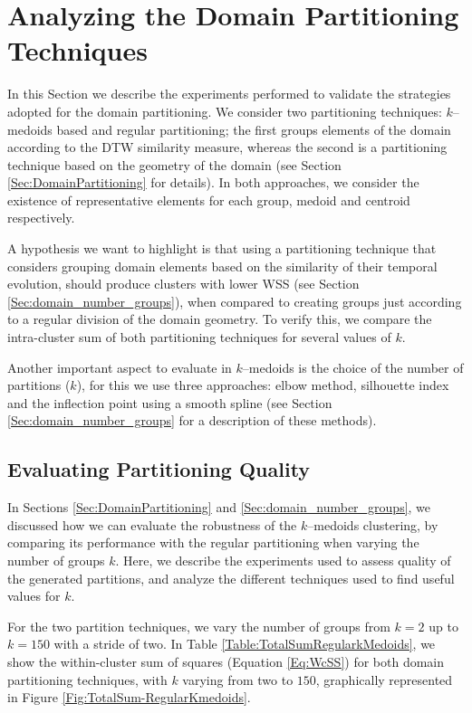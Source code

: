 \section{Analyzing the Domain Partitioning Techniques}
\label{Sec:AnalyzeDomainPartitioning}

In this Section we describe the experiments performed to validate the strategies adopted for the domain partitioning. We consider two partitioning techniques: $k$--medoids based and regular partitioning; the first groups elements of the domain according to the DTW similarity measure, whereas the second is a partitioning technique based on the geometry of the domain (see Section \ref{Sec:DomainPartitioning} for details). In both approaches, we consider the existence of representative elements for each group, medoid and centroid respectively.

A hypothesis we want to highlight is that using a partitioning technique that considers grouping domain elements based on the similarity of their temporal evolution, should produce clusters with lower WSS (see Section \ref{Sec:domain_number_groups}), when compared to creating groups just according to a regular division of the domain geometry. To verify this, we compare the intra-cluster sum of both partitioning techniques for several values of $k$.

Another important aspect to evaluate in $k$--medoids is the choice of the number of partitions ($k$), for this we use three approaches: elbow method, silhouette index and the inflection point using a smooth spline (see Section \ref{Sec:domain_number_groups} for a description of these methods).

\subsection{Evaluating Partitioning Quality}
\label{Sec:EvaluatingPP}

In Sections \ref{Sec:DomainPartitioning} and \ref{Sec:domain_number_groups}, we discussed how we can evaluate the robustness of the $k$--medoids clustering, by comparing its performance with the regular partitioning when varying the number of groups $k$. Here, we describe the experiments used to assess quality of the generated partitions, and analyze the different techniques used to find useful values for $k$.  

For the two partition techniques, we vary the number of groups from $k=2$ up to $k=150$ with a stride of two. In Table \ref{Table:TotalSumRegularkMedoids}, we show the within-cluster sum of squares (Equation \ref{Eq:WcSS}) for both domain partitioning techniques, with $k$ varying from two to $150$, graphically represented in Figure \ref{Fig:TotalSum-RegularKmedoids}. 

